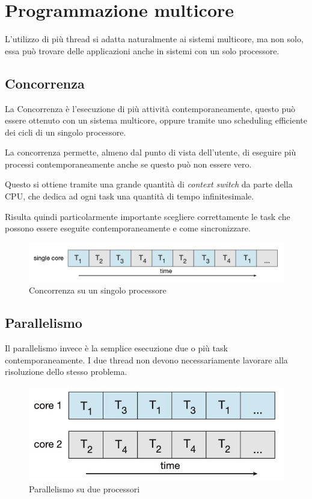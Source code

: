 \section{Programmazione multicore}
L'utilizzo di più thread si adatta naturalmente ai sistemi multicore, ma non solo, essa può trovare delle applicazioni anche in sistemi con un solo processore.

\subsection{Concorrenza}
La Concorrenza è l'esecuzione di più attività contemporaneamente, questo può essere ottenuto con un sistema multicore, oppure tramite uno scheduling efficiente dei cicli di un singolo processore.

\spacer
La concorrenza permette, almeno dal punto di vista dell'utente, di eseguire più processi contemporaneamente anche se questo può non essere vero.

Questo si ottiene tramite una grande quantità di \textit{context switch} da parte della CPU, che dedica ad ogni task una quantità di tempo infinitesimale.

Risulta quindi particolarmente importante scegliere correttamente le task che possono essere eseguite contemporaneamente e come sincronizzare.

\begin{figure}[H]
    \centering
    \includegraphics[width=0.65\linewidth]{assets/concorrenza.jpg}
    \caption{Concorrenza su un singolo processore}
\end{figure}

\subsection{Parallelismo}
Il parallelismo invece è la semplice esecuzione due o più task contemporaneamente. I due thread non devono necessariamente lavorare alla risoluzione dello stesso problema.
\begin{figure}[H]
    \centering
    \includegraphics[width=0.45\linewidth]{assets/parallelismo.jpg}
    \caption{Parallelismo su due processori}
\end{figure}

